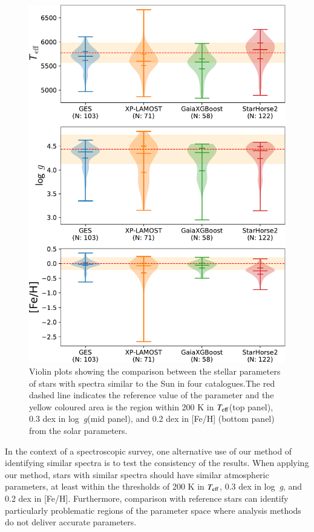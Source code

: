 \documentclass{aa}
\def\teff{$\textit{T}_{\rm{eff}}$}
\def\logg{\mbox{log~{\it g}}}
\begin{document}
\begin{figure}[htbp]
  \centering
  \includegraphics[width=0.9\linewidth]{Plots/violin_plot_example.pdf}
  \caption{Violin plots showing the comparison between the stellar parameters of stars with spectra similar to the Sun in four catalogues.The red dashed line indicates the reference value of the parameter and the yellow coloured area is the region within 200 K in \teff (top panel), 0.3 dex in \logg (mid panel), and 0.2 dex in [Fe/H] (bottom panel) from the solar parameters.}
  \label{fig:violin_sunganym}
\end{figure}


In the context of a spectroscopic survey, one alternative use of our method of identifying similar spectra is to test the consistency of the results. When applying our method, stars with similar spectra should have similar atmospheric parameters, at least within the thresholds of 200 K in \teff, 0.3 dex in \logg, and 0.2 dex in [Fe/H]. Furthermore, comparison with reference stars can identify particularly problematic regions of the parameter space where analysis methods do not deliver accurate parameters.
\end{document}
